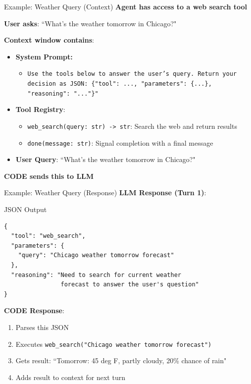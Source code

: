 \documentclass[aspectratio=169]{beamer}
\begin{document}
\begin{frame}{Example: Weather Query (Context)}
\textbf{Agent has access to a web search tool}
\vspace{0.2cm}

\textbf{User asks}: ``What's the weather tomorrow in Chicago?"
\vspace{0.3cm}

\textbf{Context window contains}:
\begin{itemize}
	

	\item \textbf{System Prompt:} 
    \begin{itemize}
        \item \texttt{Use the tools below to answer the user's query. Return your decision as JSON: \{"tool": ..., "parameters": \{...\}, "reasoning": "..."\}"}
	\end{itemize}
    \item \textbf{Tool Registry}:
    \begin{itemize}
        \item \texttt{web\_search(query: str) -> str}: Search the web and return results
        \item \texttt{done(message: str)}: Signal completion with a final message
    \end{itemize}
    \item \textbf{User Query}: ``What's the weather tomorrow in Chicago?"
\end{itemize}
\vspace{.3cm}
	\textbf{CODE sends this to LLM}
\end{frame}

\begin{frame}[fragile]{Example: Weather Query (Response)}
\textbf{LLM Response (Turn 1)}:
\vspace{0.2cm}

\begin{block}{JSON Output}
{\small
\begin{verbatim}
{
  "tool": "web_search",
  "parameters": {
    "query": "Chicago weather tomorrow forecast"
  },
  "reasoning": "Need to search for current weather
                forecast to answer the user's question"
}
\end{verbatim}
}
\end{block}
\vspace{0.3cm}

\end{frame}

\begin{frame}
	\textbf{CODE Response}:
\begin{enumerate}
    \item Parses this JSON
    \item Executes \texttt{web\_search("Chicago weather tomorrow forecast")}
    \item Gets result: ``Tomorrow: 45 deg F, partly cloudy, 20\% chance of rain"
    \item Adds result to context for next turn
\end{enumerate}

\end{frame}
\end{document}

